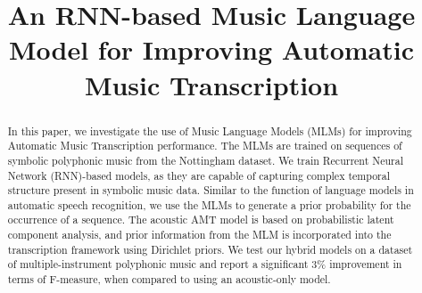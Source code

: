 \documentclass{article}
\title{An RNN-based Music Language Model for Improving Automatic Music Transcription}
\begin{document}
%
\maketitle
%

\begin{abstract}
In this paper, we investigate the use of Music Language Models (MLMs) for improving Automatic Music Transcription performance. The MLMs are trained on sequences of symbolic polyphonic music from the Nottingham dataset. We train Recurrent Neural Network (RNN)-based models, as they are capable of capturing complex temporal structure present in symbolic music data. Similar to the function of language models in automatic speech recognition, we use the MLMs to generate a prior probability for the occurrence of a sequence. The acoustic AMT model is based on probabilistic latent component analysis, and prior information from the MLM is incorporated into the transcription framework using Dirichlet priors. We test our hybrid models on a dataset of multiple-instrument polyphonic music and report a significant 3\% improvement in terms of F-measure, when compared to using an acoustic-only model.

\end{abstract}












{\small 

}
\end{document}
